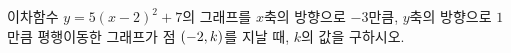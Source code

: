이차함수 $y=5(x-2)^2+7$의 그래프를 $x$축의 방향으로 $-3$만큼, $y$축의 방향으로 $1$만큼 평행이동한 그래프가 점 $(-2{,}\mkern3mu\mathopen{}k)$를 지날 때, $k$의 값을 구하시오.
